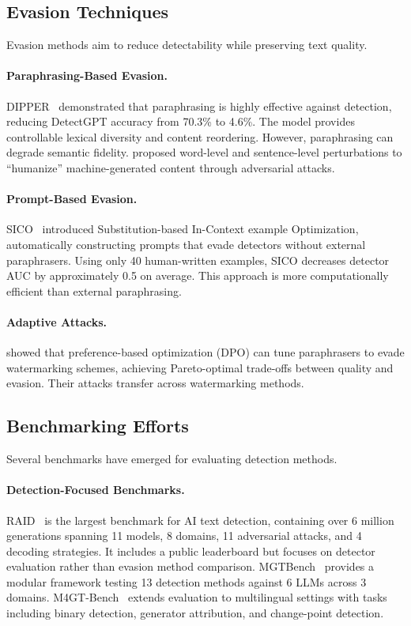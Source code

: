 \subsection{Evasion Techniques}

Evasion methods aim to reduce detectability while preserving text quality.

\paragraph{Paraphrasing-Based Evasion.} DIPPER~\citep{krishna2023paraphrasing} demonstrated that paraphrasing is highly effective against detection, reducing DetectGPT accuracy from 70.3\% to 4.6\%. The model provides controllable lexical diversity and content reordering. However, paraphrasing can degrade semantic fidelity. \citet{zhou2024humanizing} proposed word-level and sentence-level perturbations to ``humanize'' machine-generated content through adversarial attacks.

\paragraph{Prompt-Based Evasion.} SICO~\citep{lu2024sico} introduced Substitution-based In-Context example Optimization, automatically constructing prompts that evade detectors without external paraphrasers. Using only 40 human-written examples, SICO decreases detector AUC by approximately 0.5 on average. This approach is more computationally efficient than external paraphrasing.

\paragraph{Adaptive Attacks.} \citet{diaa2024adaptive} showed that preference-based optimization (DPO) can tune paraphrasers to evade watermarking schemes, achieving Pareto-optimal trade-offs between quality and evasion. Their attacks transfer across watermarking methods.

\subsection{Benchmarking Efforts}

Several benchmarks have emerged for evaluating detection methods.

\paragraph{Detection-Focused Benchmarks.} RAID~\citep{dugan2024raid} is the largest benchmark for AI text detection, containing over 6 million generations spanning 11 models, 8 domains, 11 adversarial attacks, and 4 decoding strategies. It includes a public leaderboard but focuses on detector evaluation rather than evasion method comparison. MGTBench~\citep{he2024mgtbench} provides a modular framework testing 13 detection methods against 6 LLMs across 3 domains. M4GT-Bench~\citep{wang2024m4gt} extends evaluation to multilingual settings with tasks including binary detection, generator attribution, and change-point detection.

